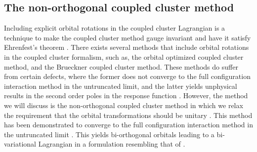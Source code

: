         \subsection{The non-orthogonal coupled cluster method}
            Including explicit orbital rotations in the coupled cluster
            Lagrangian is a technique to make the coupled cluster method gauge
            invariant \cite{gauge-invariant-thomas, gauge-invariant-thomas-2}
            and have it satisfy Ehrenfest's theorem \cite{rolf-nocc}.
            There exists several methods that include orbital rotations in the
            coupled cluster formalism, such as, the orbital optimized coupled
            cluster method, and the Brueckner coupled cluster method.
            These methods do suffer from certain defects, where the former does
            not converge to the full configuration interaction method in the
            untruncated limit, and the latter yields unphysical results in the
            second order poles in the response function \cite{rolf-nocc}.
            However, the method we will discuss is the non-orthogonal coupled
            cluster method \cite{gauge-invariant-thomas-2} in which we relax the
            requirement that the orbital transformations should be unitary
            \cite{rolf-nocc}.
            This method has been demonstrated to converge to the full
            configuration interaction method in the untruncated limit
            \cite{rolf-nocc}.
            This yields bi-orthogonal orbitals leading to a bi-variational
            Lagrangian \cite{kvaal2013variational} in a formulation resembling
            that of \citeauthor{arponen1983311} \cite{arponen1983311}.

